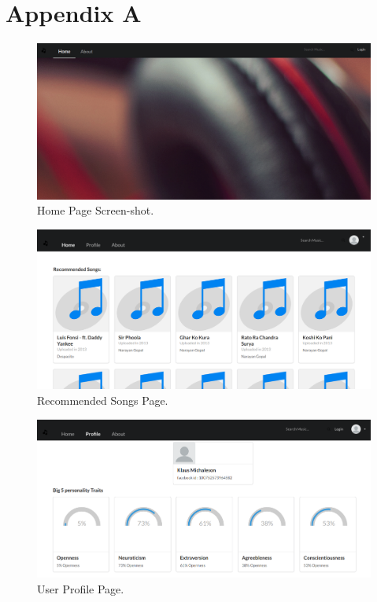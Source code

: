 \newpage
\section*{Appendix A}

\begin{figure}[h]
  \centering
    \includegraphics[width=1\textwidth]{fig/home_screenshot.png}
    \caption{Home Page Screen-shot.}
\end{figure}

\newpage
\begin{figure}[h]
  \centering
    \includegraphics[width=1\textwidth]{fig/recommended_songs.png}
    \caption{Recommended Songs Page.}
\end{figure}

\newpage
\begin{figure}[h]
  \centering
    \includegraphics[width=1\textwidth]{fig/profile_screenshot.png}
    \caption{User Profile Page.}
\end{figure}

